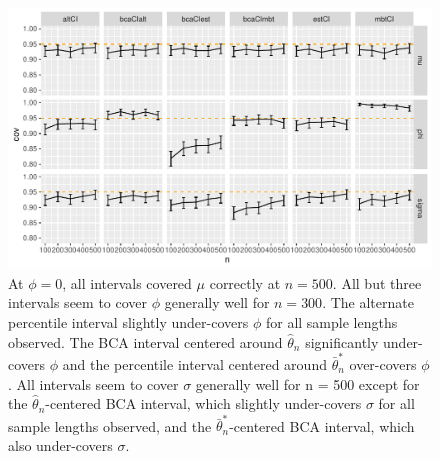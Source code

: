\documentclass[12pt, letterpaper, titlepage]{article}
\begin{document}
\begin{figure}[tbp]
\caption{}
  \centering
  \includegraphics[width=\textwidth]{figures/plot_0}
  \caption{At $\phi = 0$, all intervals covered $\mu$ correctly at $n = 500$. All but three intervals seem to cover $\phi$ generally well for $n = 300$. The alternate percentile interval slightly under-covers $\phi$ for all sample lengths observed. The BCA interval centered around $\hat{\theta}_{n}$ significantly under-covers $\phi$ and the percentile interval centered around $\bar\theta_n^*$ over-covers $\phi$. All intervals seem to cover $\sigma$ generally well for n = 500 except for the $\hat{\theta}_{n}$-centered BCA interval, which slightly under-covers $\sigma$ for all sample lengths observed, and the  $\bar\theta_n^*$-centered BCA interval, which also under-covers $\sigma$.}
  \label{fig:plot_0}
\end{figure}
\end{document}
